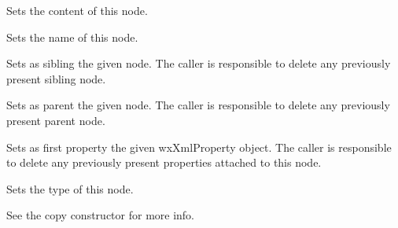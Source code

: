 \label{wxxmlnodesetcontent}


Sets the content of this node.

\label{wxxmlnodesetname}


Sets the name of this node.

\label{wxxmlnodesetnext}


Sets as sibling the given node. The caller is responsible to delete any previously present
sibling node.

\label{wxxmlnodesetparent}


Sets as parent the given node. The caller is responsible to delete any previously present
parent node.

\label{wxxmlnodesetproperties}


Sets as first property the given wxXmlProperty object.
The caller is responsible to delete any previously present properties attached to this node.

\label{wxxmlnodesettype}


Sets the type of this node.

\label{wxxmlnodeoperatorassign}


See the copy constructor for more info.

